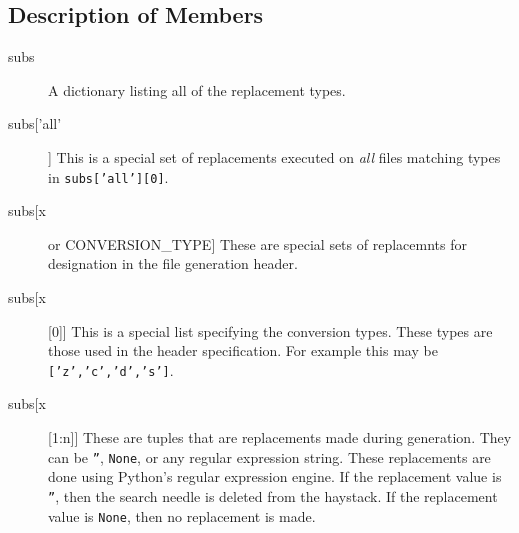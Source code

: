 \subsection{Description of Members}
\label{codegen:moddescription}
\begin{description}
\item[subs]
A dictionary listing all of the replacement types.
\item[subs['all']]
This is a special set of replacements executed on {\em all} files matching types in {\tt subs['all'][0]}.
\item[subs[x] or CONVERSION\_TYPE]
These are special sets of replacemnts for designation in the file generation header.
\item[subs[x][0]]
This is a special list specifying the conversion types.  These types are those used in the
header specification. For example this may be {\tt ['z','c','d','s']}.
\item[subs[x][1:n]]
These are tuples that are replacements made during generation.  They can be {\tt ''}, {\tt None}, or any
regular expression string.  These replacements are done using Python's regular expression engine.
If the replacement value is {\tt ''}, then the search needle is deleted from the haystack.
If the replacement value is {\tt None}, then no replacement is made.

\end{description}

	
